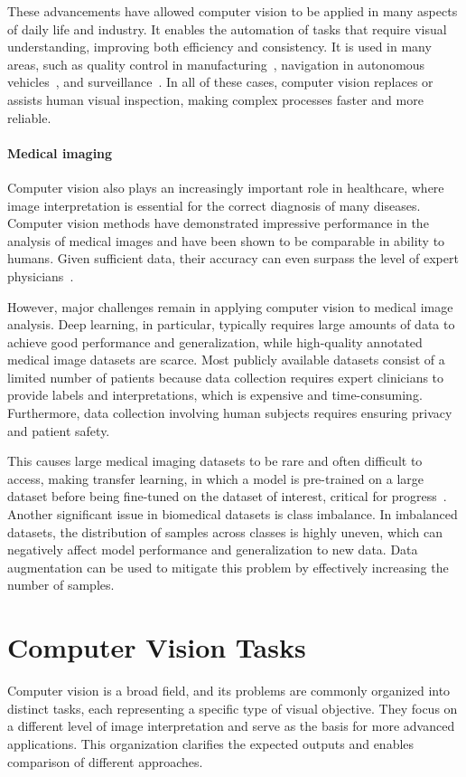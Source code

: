 These advancements have allowed computer vision to be applied in many aspects of daily life and industry. It enables the automation of tasks that require visual understanding, improving both efficiency and consistency. It is used in many areas, such as quality control in manufacturing~\cite{Islam2024}, navigation in autonomous vehicles~\cite{Horgan2015}, and surveillance~\cite{Cazzato2020}. In all of these cases, computer vision replaces or assists human visual inspection, making complex processes faster and more reliable.

\paragraph{Medical imaging} Computer vision also plays an increasingly important role in healthcare, where image interpretation is essential for the correct diagnosis of many diseases. Computer vision methods have demonstrated impressive performance in the analysis of medical images and have been shown to be comparable in ability to humans. Given sufficient data, their accuracy can even surpass the level of expert physicians~\cite{Esteva2021}.

However, major challenges remain in applying computer vision to medical image analysis. Deep learning, in particular, typically requires large amounts of data to achieve good performance and generalization, while high-quality annotated medical image datasets are scarce. Most publicly available datasets consist of a limited number of patients because data collection requires expert clinicians to provide labels and interpretations, which is expensive and time-consuming. Furthermore, data collection involving human subjects requires ensuring privacy and patient safety.

This causes large medical imaging datasets to be rare and often difficult to access, making transfer learning, in which a model is pre-trained on a large dataset before being fine-tuned on the dataset of interest, critical for progress~\cite{Esteva2021}. Another significant issue in biomedical datasets is class imbalance. In imbalanced datasets, the distribution of samples across classes is highly uneven, which can negatively affect model performance and generalization to new data. Data augmentation can be used to mitigate this problem by effectively increasing the number of samples.~\cite{Aljuaid2022, Lindroth2024}


\section{Computer Vision Tasks}
Computer vision is a broad field, and its problems are commonly organized into distinct tasks, each representing a specific type of visual objective. They focus on a different level of image interpretation and serve as the basis for more advanced applications. This organization clarifies the expected outputs and enables comparison of different approaches.

